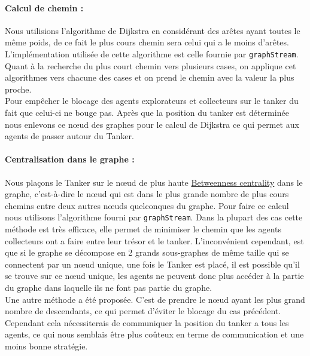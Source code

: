 \documentclass[10pt]{article}
\newcommand\tab[1][0.65cm]{\hspace*{#1}}
\begin{document}
\paragraph{Calcul de chemin :} Nous utilisions l'algorithme de Dijkstra en considérant des arêtes ayant toutes le même poids, de ce fait le plus cours chemin sera celui qui a le moins d'arêtes. L'implémentation utilisée de cette algorithme est celle fournie par \texttt{graphStream}. Quant à la recherche du plus court chemin vers plusieurs cases, on applique cet algorithmes vers chacune des cases et on prend le chemin avec la valeur la plus proche.\\
\tab Pour empêcher le blocage des agents explorateurs et collecteurs sur le tanker du fait que celui-ci ne bouge pas. Après que la position du tanker est déterminée nous enlevons ce nœud des graphes pour le calcul de Dijkstra ce qui permet aux agents de passer autour du Tanker.
\paragraph{Centralisation dans le graphe :} Nous plaçons le Tanker sur le nœud de plus haute \href{https://en.wikipedia.org/wiki/Betweenness_centrality}{Betweenness centrality} dans le graphe, c'est-à-dire le nœud  qui est dans le plus grande nombre de plus cours chemins entre deux autres nœuds quelconques du graphe. Pour faire ce calcul nous utilisons l'algorithme fourni par \texttt{graphStream}. Dans la plupart des cas cette méthode est très efficace, elle permet de minimiser le chemin que les agents collecteurs ont a faire entre leur trésor et le tanker. L'inconvénient cependant, est que si le graphe se décompose en 2 grands sous-graphes de même taille qui se connectent par un nœud unique, une fois le Tanker est placé, il est possible qu'il se trouve sur ce nœud unique, les agents ne peuvent donc plus accéder à la partie du graphe dans laquelle ils ne font pas partie du graphe.\\
\tab Une autre méthode a été proposée. C'est de prendre le nœud ayant les plus grand nombre de descendants, ce qui permet d'éviter le blocage du cas précédent. Cependant cela nécessiterais de communiquer la position du tanker a tous les agents, ce qui nous semblais être plus coûteux en terme de communication et une moins bonne stratégie.
	
\end{document}
